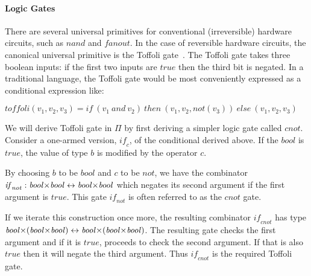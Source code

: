 \paragraph*{Logic Gates}
There are several universal primitives for conventional (irreversible)
hardware circuits, such as \ensuremath{\mathit{nand}} and \ensuremath{\mathit{fanout}}. In the case
of reversible hardware circuits, the canonical universal primitive is
the Toffoli gate~\cite{Toffoli:1980}. The Toffoli gate takes three
boolean inputs: if the first two inputs are \ensuremath{\mathit{true}} then the third
bit is negated. In a traditional language, the Toffoli gate would be
most conveniently expressed as a conditional expression like:

\noindent
\ensuremath{ \mathit{toffoli}(v_1,v_2,v_3) = \mathit{if} ~(v_1 ~\mathit{and} ~v_2) ~\mathit{then} ~(v_1, v_2, \mathit{not}(v_3)) ~\mathit{else} ~(v_1, v_2, v_3)}

We will derive Toffoli gate in \ensuremath{\Pi } by first deriving a simpler
logic gate called \ensuremath{\mathit{cnot}}.  Consider a one-armed version, \ensuremath{\mathit{if}_c},
of the conditional derived above. If the \ensuremath{\mathit{bool}} is
\ensuremath{\mathit{true}}, the value of type \ensuremath{b} is modified by the operator \ensuremath{c}.

\begin{center}
\scalebox{1.5}{
}
\end{center}


By choosing \ensuremath{b} to be \ensuremath{\mathit{bool}} and \ensuremath{c} to be \ensuremath{\mathit{not}}, we have the
combinator \ensuremath{\mathit{if}_{\mathit{not}} : \mathit{bool} {\prodtype}  \mathit{bool}\leftrightarrow \mathit{bool} {\prodtype}  \mathit{bool}} which negates its
second argument if the first argument is \ensuremath{\mathit{true}}. This gate
\ensuremath{\mathit{if}_{\mathit{not}}} is often referred to as the \ensuremath{\mathit{cnot}} gate\cite{Toffoli:1980}.

If we iterate this construction once more, the resulting combinator
\ensuremath{\mathit{if}_{\mathit{cnot}}} has type \ensuremath{\mathit{bool} {\prodtype}  (\mathit{bool} {\prodtype}  \mathit{bool})\leftrightarrow \mathit{bool} {\prodtype}  (\mathit{bool} {\prodtype}  \mathit{bool})}. The
resulting gate checks the first argument and if it is \ensuremath{\mathit{true}},
proceeds to check the second argument. If that is also \ensuremath{\mathit{true}} then
it will negate the third argument. Thus \ensuremath{\mathit{if}_{\mathit{cnot}}} is the required
Toffoli gate.

\begin{center}
\scalebox{1.6}{
}
\end{center}

